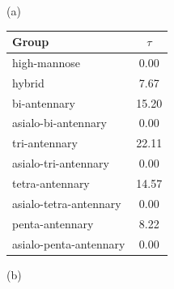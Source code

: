     \begin{table}
        \begin{minipage}[t]{0.25\linewidth}
            \vspace{0pt}
            (a)
            \centering
            
    \begin{tabular}{l | c}
        Group & $\tau$ \\
        \hline
        high-mannose & 0.00 \\
        hybrid & 7.67 \\
        bi-antennary & 15.20 \\
        asialo-bi-antennary & 0.00 \\
        tri-antennary & 22.11 \\
        asialo-tri-antennary & 0.00 \\
        tetra-antennary & 14.57 \\
        asialo-tetra-antennary & 0.00 \\
        penta-antennary & 8.22 \\
        asialo-penta-antennary & 0.00 \\
    \end{tabular}
    
            
        \end{minipage}
        \hspace{1cm}
        \begin{minipage}[t]{0.55\linewidth}
            \vspace{0pt}
            (b)
            \centering
            

\end{minipage}
\end{table}
